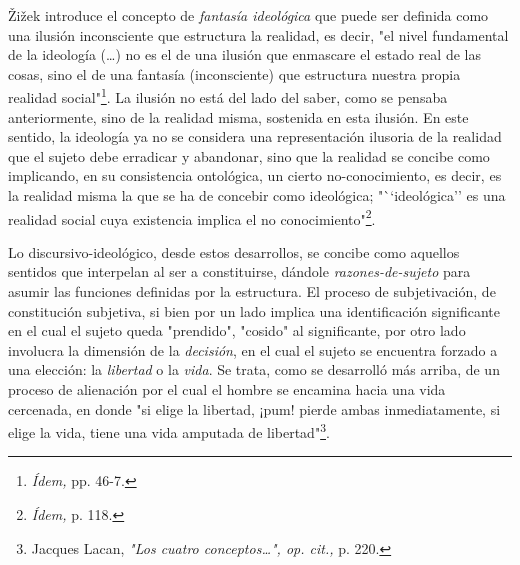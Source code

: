 \documentclass{book}
\begin{document}
Žižek introduce el concepto de \emph{fantasía ideológica} que puede ser
definida como una ilusión inconsciente que estructura la realidad, es
decir, "el nivel fundamental de la ideología (\dots) no es el de
una ilusión que enmascare el estado real de las cosas, sino el de una
fantasía (inconsciente) que estructura nuestra propia realidad
social"\footnote{\emph{Ídem,} pp. 46-7.}. La ilusión no está del lado
del saber, como se pensaba anteriormente, sino de la realidad misma,
sostenida en esta ilusión. En este sentido, la ideología ya no se
considera una representación ilusoria de la realidad que el sujeto debe
erradicar y abandonar, sino que la realidad se concibe como implicando,
en su consistencia ontológica, un cierto no-conocimiento, es decir, es
la realidad misma la que se ha de concebir como ideológica;
"``ideológica'' es una realidad social cuya existencia implica el no
conocimiento"\footnote{\emph{Ídem,} p. 118.}.

Lo discursivo-ideológico, desde estos desarrollos, se concibe como
aquellos sentidos que interpelan al ser a constituirse, dándole
\emph{razones-de-sujeto} para asumir las funciones definidas por la
estructura. El proceso de subjetivación, de constitución subjetiva, si
bien por un lado implica una identificación significante en el cual el
sujeto queda "prendido", "cosido" al significante, por otro lado
involucra la dimensión de la \emph{decisión}, en el cual el sujeto se
encuentra forzado a una elección: la \emph{libertad} o la \emph{vida}.
Se trata, como se desarrolló más arriba, de un proceso de alienación por
el cual el hombre se encamina hacia una vida cercenada, en donde "si
elige la libertad, ¡pum! pierde ambas inmediatamente, si elige la vida,
tiene una vida amputada de libertad"\footnote{Jacques Lacan, \emph{"Los
  cuatro conceptos\ldots", op. cit.,} p. 220.}.
\end{document}
